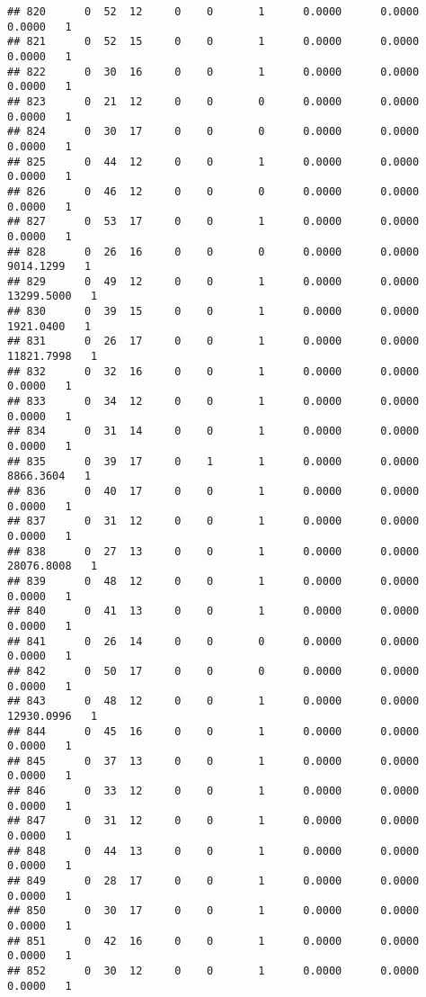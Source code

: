 \documentclass[
]{article}
\begin{document}
\begin{enumerate}
\begin{verbatim}
## 820      0  52  12     0    0       1      0.0000      0.0000      0.0000   1
## 821      0  52  15     0    0       1      0.0000      0.0000      0.0000   1
## 822      0  30  16     0    0       1      0.0000      0.0000      0.0000   1
## 823      0  21  12     0    0       0      0.0000      0.0000      0.0000   1
## 824      0  30  17     0    0       0      0.0000      0.0000      0.0000   1
## 825      0  44  12     0    0       1      0.0000      0.0000      0.0000   1
## 826      0  46  12     0    0       0      0.0000      0.0000      0.0000   1
## 827      0  53  17     0    0       1      0.0000      0.0000      0.0000   1
## 828      0  26  16     0    0       0      0.0000      0.0000   9014.1299   1
## 829      0  49  12     0    0       1      0.0000      0.0000  13299.5000   1
## 830      0  39  15     0    0       1      0.0000      0.0000   1921.0400   1
## 831      0  26  17     0    0       1      0.0000      0.0000  11821.7998   1
## 832      0  32  16     0    0       1      0.0000      0.0000      0.0000   1
## 833      0  34  12     0    0       1      0.0000      0.0000      0.0000   1
## 834      0  31  14     0    0       1      0.0000      0.0000      0.0000   1
## 835      0  39  17     0    1       1      0.0000      0.0000   8866.3604   1
## 836      0  40  17     0    0       1      0.0000      0.0000      0.0000   1
## 837      0  31  12     0    0       1      0.0000      0.0000      0.0000   1
## 838      0  27  13     0    0       1      0.0000      0.0000  28076.8008   1
## 839      0  48  12     0    0       1      0.0000      0.0000      0.0000   1
## 840      0  41  13     0    0       1      0.0000      0.0000      0.0000   1
## 841      0  26  14     0    0       0      0.0000      0.0000      0.0000   1
## 842      0  50  17     0    0       0      0.0000      0.0000      0.0000   1
## 843      0  48  12     0    0       1      0.0000      0.0000  12930.0996   1
## 844      0  45  16     0    0       1      0.0000      0.0000      0.0000   1
## 845      0  37  13     0    0       1      0.0000      0.0000      0.0000   1
## 846      0  33  12     0    0       1      0.0000      0.0000      0.0000   1
## 847      0  31  12     0    0       1      0.0000      0.0000      0.0000   1
## 848      0  44  13     0    0       1      0.0000      0.0000      0.0000   1
## 849      0  28  17     0    0       1      0.0000      0.0000      0.0000   1
## 850      0  30  17     0    0       1      0.0000      0.0000      0.0000   1
## 851      0  42  16     0    0       1      0.0000      0.0000      0.0000   1
## 852      0  30  12     0    0       1      0.0000      0.0000      0.0000   1

\end{verbatim}
\end{enumerate}
\end{document}
